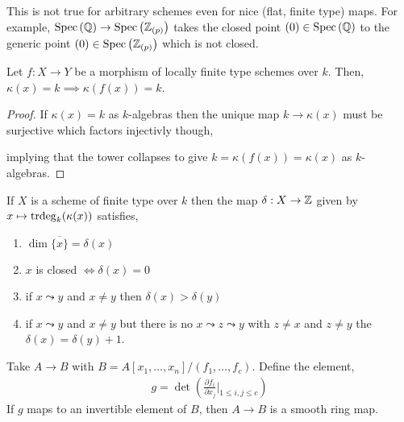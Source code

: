 \documentclass[12pt]{article}
\begin{document}
\begin{remark}
This is not true for arbitrary schemes even for nice (flat, finite type) maps. For example, $\mathrm{Spec}\left( \mathbb{Q} \right) \to \mathrm{Spec}\left( \mathbb{Z}_{(p)} \right)$ takes the closed point $(0) \in \mathrm{Spec}\left( \mathbb{Q} \right)$ to the generic point $(0) \in \mathrm{Spec}\left( \mathbb{Z}_{(p)} \right)$ which is not closed. 
\end{remark}

\begin{corollary}
Let $f : X \to Y$ be a morphism of locally finite type schemes over $k$. Then, $\kappa(x) = k \implies \kappa(f(x)) = k$.
\end{corollary}

\begin{proof}
If $\kappa(x) = k$ as $k$-algebras then the unique map $k \to \kappa(x)$ must be surjective which factors injectivly though,
\begin{center}
\end{center}  
implying that the tower collapses to give $k = \kappa(f(x)) = \kappa(x)$ as $k$-algebras.
\end{proof}


\begin{proposition}
If $X$ is a scheme of finite type over $k$ then the map $\delta : X \to \mathbb{Z}$ given by $x \mapsto \mathrm{trdeg}_{k}(\kappa(x))$ satisfies,
\begin{enumerate}
\item $\dim{\overline{\{ x \}}} = \delta(x)$
\item $x$ is closed $\iff \delta(x) = 0$
\item if $x \leadsto y$ and $x \neq y$ then $\delta(x) > \delta(y)$
\item if $x \leadsto y$ and $x \neq y$ but there is no $x \leadsto z \leadsto y$ with $z \neq x$ and $z \neq y$ the $\delta(x) = \delta(y) + 1$. 
\end{enumerate}
\end{proposition}

\begin{example}
Take $A \to B$ with $B = A[x_1, \dots, x_n] / (f_1, \dots, f_c)$. Define the element,
\begin{align*}
g = \det{\left( \frac{\partial f_i}{\partial x_j} \bigg|_{1 \le i,j \le c} \right)}
\end{align*}
If $g$ maps to an invertible element of $B$, then $A \to B$ is a smooth ring map. 
\end{example}
\end{document}
